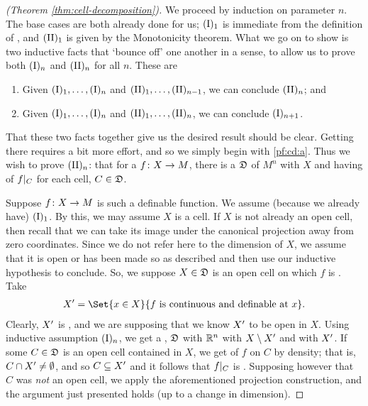 \begin{proof}[\CD (Theorem \ref{thm:cell-decomposition})]
  We proceed by induction on parameter $n$. The base cases are both already done for us; $\In[1]$ is immediate from the definition of \omy, and $\IIn[1]$ is given by the Monotonicity theorem. What we go on to show is two inductive facts that `bounce off' one another in a sense, to allow us to prove both $\In$ and $\IIn$ for all $n$. These are
  \begin{enumerate}[label=(\alph*)]
    \item \label{pf:cd:a} Given $\In[1], \hdots, \In$ and $\IIn[1], \hdots, \IIn[n-1]$, we can conclude $\IIn$; and
    \item \label{pf:cd:b} Given $\In[1], \hdots, \In$ and $\IIn[1], \hdots, \IIn[n]$, we can conclude $\In[n+1]$.
  \end{enumerate}
  That these two facts together give us the desired result should be clear.
  Getting there requires a bit more effort, and so we simply begin with \ref{pf:cd:a}.
  Thus we wish to prove $\IIn[n]$: that for a  $\funcdom{f}{X}{M}$, there is a \cd $\fancyD$ of $M^n$ \cmptble with $X$ and having \contty of $\funcrestr{f}{C}$ for each cell, $C \in \fancyD$.

  Suppose $\funcdom{f}{X}{M}$ is such a definable function. We assume (because we already have) $\In[1]$. By this, we may assume $X$ is a cell. If $X$ is not already an open cell, then recall that we can take its image under the canonical projection away from zero coordinates. Since we do not refer here to the dimension of $X$, we assume that it is open or has been made so as described and then use our inductive hypothesis to conclude. So, we suppose $X \in \fancyD$ is an open cell on which $f$ is \cont. Take
  \begin{align*}
	\Xprime = \Set{x \in X}{f \ \textrm{is \cont and \defnb at} \ x}.
  \end{align*}
  Clearly, $\Xprime$ is , and we are supposing that we know $\Xprime$ to be open in $X$. Using inductive assumption $\In[n]$, we get a \cd, $\fancyD$ with $\R^n$ \cmptble with $X \setminus \Xprime$ and with $\Xprime$. If some $C \in \fancyD$ is an open cell contained in $X$, we get \contty of $f$ on $C$  by density; that is, $C \cap \Xprime \neq \emptyset$, and so $C \subseteq \Xprime$ and it follows that $\funcrestr{f}{C}$ is \cont. Supposing however that $C$ was \emph{not} an open cell, we apply the aforementioned projection construction, and the argument just presented holds (up to a change in dimension).


\end{proof}
